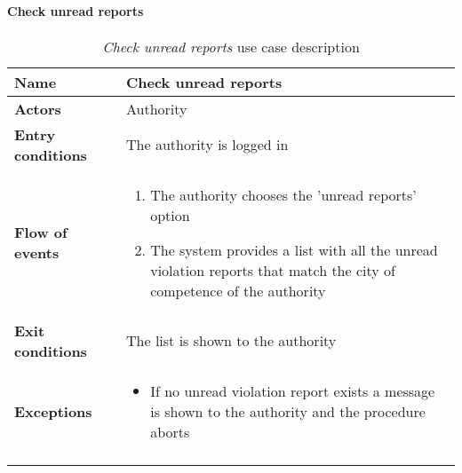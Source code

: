		\paragraph{Check unread reports}
		\begin{longtable}{p{0.25\linewidth}p{0.75\linewidth}}
			\toprule
			\textbf{Name} & \textbf{Check unread reports} \\
			\midrule
			\textbf{Actors} & Authority\\
			\midrule
			\textbf{Entry conditions} & The authority is logged in \\
			\midrule
			\textbf{Flow of events} & 
			\begin{enumerate}
				\item The authority chooses the 'unread reports' option
				\item The system provides a list with all the unread violation reports that match the city of competence of the authority
			\end{enumerate} \\
			\midrule
			\textbf{Exit conditions} & The list is shown to the authority\\
			\midrule
			\textbf{Exceptions} & 
			\begin{itemize}
				\item If no unread violation report exists a message is shown to the authority and the procedure aborts
			\end{itemize} \\
			\bottomrule
			\caption{\emph{Check unread reports} use case description}
		\end{longtable}
	
